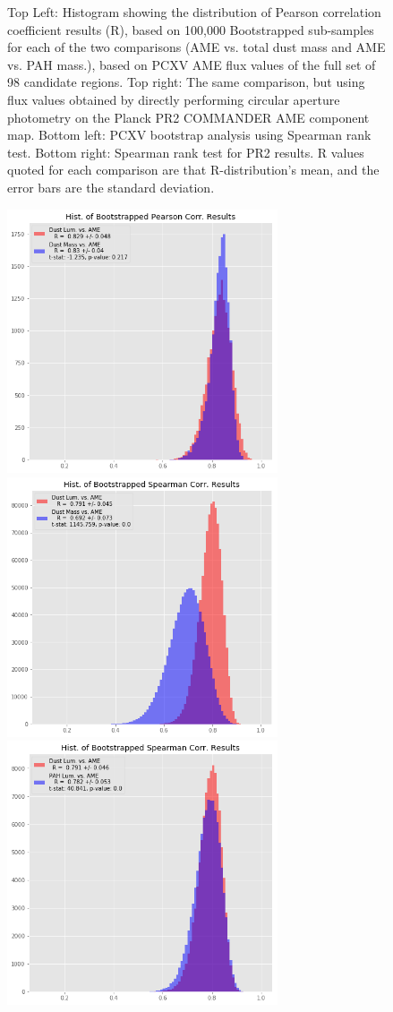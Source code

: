 \documentclass[preprint2,longabstract]{aastex}
\begin{document}
\begin{figure}
\centering  
\caption{Top Left: Histogram showing the distribution of Pearson correlation coefficient results (R), based on 100,000 Bootstrapped sub-samples for each of the two comparisons (AME vs. total dust mass and AME vs. PAH mass.), based on PCXV AME flux values of the full set of 98 candidate regions. Top right:  The same comparison, but using flux values obtained by directly performing circular aperture photometry on the Planck PR2 COMMANDER AME component map. Bottom left: PCXV bootstrap analysis using Spearman rank test. Bottom right: Spearman rank test for PR2 results. R values quoted for each comparison are that R-distribution's mean, and the error bars are the standard deviation. }
\end{figure}

\begin{figure}
\label{fig:AME_boostrap_lum_regs_pr2}
\includegraphics[width=80mm]{Plots/AMEregs_bootstrap_DmassDlum_PCXV.png}
\includegraphics[width=80mm]{Plots/AMEregs_bootstrap_DmassDlum_spearman_PCXV.png}
\includegraphics[width=80mm]{Plots/AMEregs_bootstrap_PmassDlum_spearman_PR2.png}

\end{figure}
\end{document}
